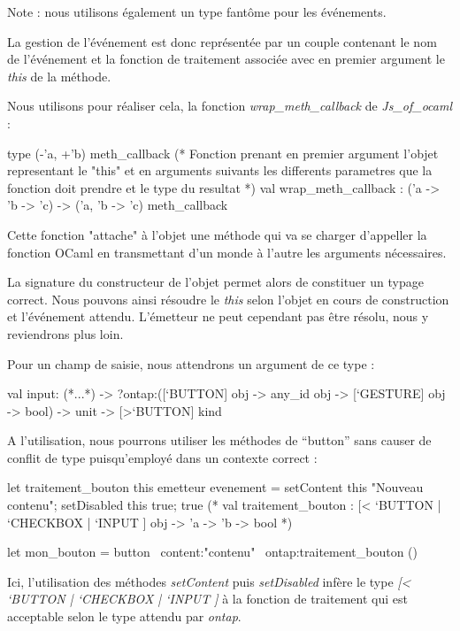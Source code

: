 \documentclass[11pt,a4paper]{report}
\begin{document}
Note : nous utilisons également un type fantôme pour les événements.

La gestion de l'événement est donc représentée par un couple contenant le nom de l'événement et la 
fonction de traitement associée avec en premier argument le \emph{this} de la méthode.

Nous utilisons pour réaliser cela, la fonction \emph{wrap\_meth\_callback} de \emph{Js\_of\_ocaml} :
\begin{OCaml}
type (-'a, +'b) meth_callback
(* Fonction prenant en premier argument l'objet representant le "this"
   et en arguments suivants les differents parametres que la
   fonction doit prendre et le type du resultat *)
val wrap_meth_callback : ('a -> 'b -> 'c) -> ('a, 'b -> 'c) meth_callback
\end{OCaml}

Cette fonction "attache" à l'objet une méthode qui va se charger d'appeller la fonction OCaml
en transmettant d'un monde à l'autre les arguments nécessaires.

La signature du constructeur de l'objet permet alors de constituer un typage correct.
Nous pouvons ainsi résoudre le \emph{this} selon l'objet en cours de construction et l'événement attendu.
L'émetteur ne peut cependant pas être résolu, nous y reviendrons plus loin.

Pour un champ de saisie, nous attendrons un argument de ce type :

\begin{OCaml}
  val input:
    (*...*)
    -> ?ontap:([`BUTTON] obj -> any_id obj -> [`GESTURE] obj -> bool)
    -> unit -> [>`BUTTON] kind
\end{OCaml}

A l'utilisation, nous pourrons utiliser les méthodes de ``button'' sans causer de conflit de type 
puisqu'employé dans un contexte correct :

\begin{OCaml}
let traitement_bouton this emetteur evenement = 
   setContent this "Nouveau contenu"; 
   setDisabled this true; 
   true
(*
val traitement_bouton :
  [< `BUTTON | `CHECKBOX | `INPUT ] obj -> 'a -> 'b -> bool
*)

let mon_bouton = button ~content:"contenu" ~ontap:traitement_bouton ()
\end{OCaml}

Ici, l'utilisation des méthodes \emph{setContent} puis \emph{setDisabled} infère le
type \emph{[< `BUTTON | `CHECKBOX | `INPUT ]} à la fonction de traitement qui est
acceptable selon le type attendu par \emph{ontap}.
\end{document}
